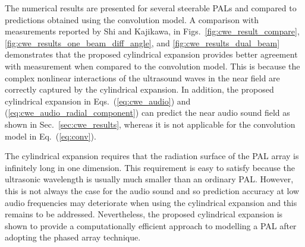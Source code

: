 The numerical results are presented for several steerable PALs and compared to predictions obtained using the convolution model. A comparison with measurements reported by Shi and Kajikawa, in Figs.~\ref{fig:cwe_result_compare}, \ref{fig:cwe_results_one_beam_diff_angle}, and \ref{fig:cwe_results_dual_beam} demonstrates that the proposed cylindrical expansion provides better agreement with measurement when compared to the convolution model. This is because the complex nonlinear interactions of the ultrasound waves in the near field are correctly captured by the cylindrical expansion. In addition, the proposed cylindrical expansion in Eqs.~(\ref{eq:cwe_audio}) and (\ref{eq:cwe_audio_radial_component}) can predict the near audio sound field as shown in Sec.~\ref{sec:cwe_results}, whereas it is not applicable for the convolution model in Eq.~(\ref{eq:conv}). 

The cylindrical expansion requires that the radiation surface of the PAL array is infinitely long in one dimension. 
This requirement is easy to satisfy because the ultrasonic wavelength is usually much smaller than an ordinary PAL. However, this is not always the case for the audio sound and so prediction accuracy at low audio frequencies may deteriorate when using the cylindrical expansion and this remains to be addressed. Nevertheless, the proposed cylindrical expansion is shown to provide a computationally efficient approach to modelling a PAL after adopting the phased array technique.

